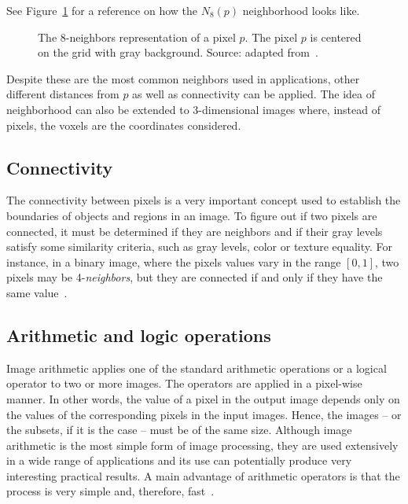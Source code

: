 See Figure~\ref{fig:n8-neighbors} for a reference on how the $N_8(p)$ neighborhood looks like.

\begin{figure}[ht]
    \centering

    \caption[The 8-\textit{neighbors} representation of a pixel $p$]{The 8-neighbors representation of a pixel $p$. The pixel $p$ is centered on the grid with gray background. Source: adapted from~\citet{pedrini:08}.}
    \label{fig:n8-neighbors}
\end{figure}

Despite these are the most common neighbors used in applications, other different distances from $p$ as well as connectivity can be applied. The idea of neighborhood can also be extended to 3-dimensional images where, instead of pixels, the voxels are the coordinates considered.


\subsection{Connectivity}
\label{sec:connectivity}
The connectivity between pixels is a very important concept used to establish the boundaries of objects and regions in an image. To figure out if two pixels are connected, it must be determined if they are neighbors and if their gray levels satisfy some similarity criteria, such as gray levels, color or texture equality. For instance, in a binary image, where the pixels values vary in the range $[0, 1]$, two pixels may be 4-\textit{neighbors}, but they are connected if and only if they have the same value~\citep{gonzalez:02}.


\subsection{Arithmetic and logic operations}
\label{sec:ari_logic_operations}
Image arithmetic applies one of the standard arithmetic operations or a logical operator to two or more images. The operators are applied in a pixel-wise manner. In other words, the value of a pixel in the output image depends only on the values of the corresponding pixels in the input images. Hence, the images -- or the subsets, if it is the case -- must be of the same size. Although image arithmetic is the most simple form of image processing, they are used extensively in a wide range of applications and its use can potentially produce very interesting practical results. A main advantage of arithmetic operators is that the process is very simple and, therefore, fast~\citep{gonzalez:02}.

